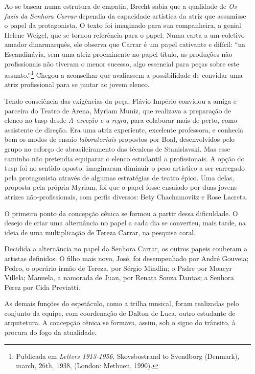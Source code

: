 Ao se basear numa estrutura de empatia, Brecht sabia que a qualidade de
{\it Os fuzis da Senhora Carrar} dependia da capacidade artística da
atriz que assumisse o papel da protagonista. O texto foi imaginado para
sua companheira, a genial Helene Weigel, que se tornou referência para o
papel. Numa carta a um coletivo amador dinarmarquês, ele observa que
Carrar é um papel cativante e difícil: “na Escandinávia, sem uma atriz
proeminente no papel-título, as produções não-profissionais não tiveram
o menor sucesso, algo essencial para peças sobre este
assunto.”\footnote{Publicada em {\it Letters 1913-1956,} Skovsbostrand
  to Svendborg (Denmark), march, 26th, 1938, (London: Methuen, 1990).}
Chegou a aconselhar que avaliassem a possibilidade de convidar uma atriz
profissional para se juntar ao jovem elenco.

Tendo consciência das exigências da peça, Flávio Império convidou a
amiga e parceira do Teatro de Arena, Myriam Muniz, que realizava a
preparação de elenco no {\sc tusp} desde {\it A exceção e a regra}, para
colaborar mais de perto, como assistente de direção. Era uma atriz
experiente, excelente professora, e conhecia bem os modos de ensaio
{\it laboratoriais} propostos por Boal, desenvolvidos pelo grupo no
esforço de abrasileiramento das técnicas de Stanislavski. Mas esse
caminho não pretendia equiparar o elenco estudantil a profissionais. A
opção do {\sc tusp} foi no sentido oposto: imaginaram diminuir o peso
artístico a ser carregado pela protagonista através de algumas
estratégias de teatro épico. Uma delas, proposta pela própria Myriam,
foi que o papel fosse ensaiado por duas jovens atrizes
não-profissionais, com perfis diversos: Bety Chachamovitz e Rose
Lacreta.

O primeiro ponto da concepção cênica se formou a partir dessa
dificuldade. O desejo de criar uma alternância no papel a cada dia se
converteu, mais tarde, na ideia de uma multiplicação de Tereza Carrar,
na pesquisa coral.

Decidida a alternância no papel da Senhora Carrar, os outros papeis
couberam a artistas definidos. O filho mais novo, José, foi desempenhado
por André Gouveia; Pedro, o operário irmão de Tereza, por Sérgio
Mindlin; o Padre por Moacyr Villela; Manuela, a namorada de Juan, por
Renata Souza Dantas; a Senhora Perez por Cida Previatti.

As demais funções do espetáculo, como a trilha musical, foram realizadas
pelo conjunto da equipe, com coordenação de Dalton de Luca, outro
estudante de arquitetura. A concepção cênica se formava, assim, sob o
signo do trânsito, à procura do fogo da atualidade.


